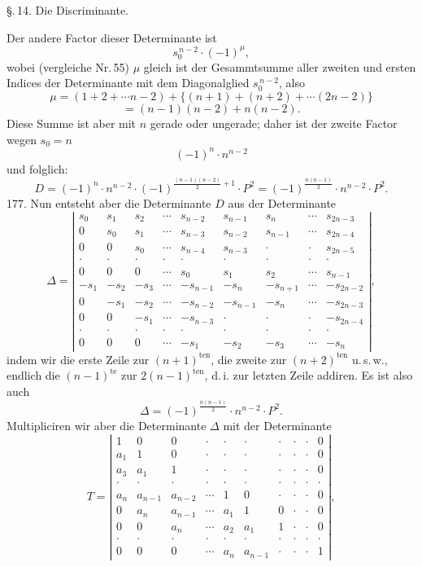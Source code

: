 \documentclass[11pt]{article}
\let\Delta\varDelta
\begin{document}
\S.\,14. Die Discriminante.

Der andere Factor dieser Determinante ist
\[
s_0^{\,n-2} \cdot (-1)^\mu,
\]
wobei (vergleiche Nr.\,55) $\mu$ gleich ist der Gesammtsumme aller zweiten und ersten Indices der Determinante mit dem Diagonalglied $s_0^{\,n-2}$, also
\[
\mu = (1+2+\cdots n-2) + \{(n+1)+(n+2)+\cdots(2n-2)\}
\]
\[
= (n-1)(n-2) + n(n-2).
\]
Diese Summe ist aber mit $n$ gerade oder ungerade; daher ist der zweite Factor wegen $s_0 = n$
\[
(-1)^n \cdot n^{n-2}
\]
und folglich:
\[
D = (-1)^n \cdot n^{n-2} \cdot (-1)^{\frac{(n-1)(n-2)}{2}+1} \cdot P^2 = (-1)^{\frac{n(n-1)}{2}} \cdot n^{n-2} \cdot P^2 .
\]
177. Nun entsteht aber die Determinante $D$ aus der Determinante
\[
\Delta =
\left|
\begin{array}{ccccccccc}
s_0 & s_1 & s_2 & \cdots & s_{n-2} & s_{n-1} & s_n & \cdots & s_{2n-3} \\
0 & s_0 & s_1 & \cdots & s_{n-3} & s_{n-2} & s_{n-1} & \cdots & s_{2n-4} \\
0 & 0 & s_0 & \cdots & s_{n-4} & s_{n-3} & \cdot & \cdot & s_{2n-5} \\
\cdot & \cdot & \cdot & \cdot & \cdot & \cdot & \cdot & \cdot & \cdot \\
0 & 0 & 0 & \cdots & s_0 & s_1 & s_2 & \cdots & s_{n-1} \\
-s_1 & -s_2 & -s_3 & \cdots & -s_{n-1} & -s_n & -s_{n+1} & \cdots & -s_{2n-2} \\
0 & -s_1 & -s_2 & \cdots & -s_{n-2} & -s_{n-1} & -s_n & \cdots & -s_{2n-3} \\
0 & 0 & -s_1 & \cdots & -s_{n-3} & \cdot & \cdot & \cdot & -s_{2n-4} \\
\cdot & \cdot & \cdot & \cdot & \cdot & \cdot & \cdot & \cdot & \cdot \\
0 & 0 & 0 & \cdots & -s_1 & -s_2 & -s_3 & \cdots & -s_n
\end{array}
\right| ,
\]
indem wir die erste Zeile zur $(n+1)^{\mathrm{ten}}$, die zweite zur $(n+2)^{\mathrm{ten}}$ u.\,s.\,w., endlich die $(n-1)^{\mathrm{te}}$ zur $2(n-1)^{\mathrm{ten}}$, d.\,i. zur letzten Zeile addiren. Es ist also auch
\[
\Delta = (-1)^{\frac{n(n-1)}{2}} \cdot n^{n-2} \cdot P^2 .
\]
Multipliciren wir aber die Determinante $\Delta$ mit der Determinante
\[
T =
\left|
\begin{array}{cccccccccc}
1 & 0 & 0 & \cdot & \cdot & \cdot & \cdot & \cdot & \cdot & 0 \\
a_1 & 1 & 0 & \cdot & \cdot & \cdot & \cdot & \cdot & \cdot & 0 \\
a_3 & a_1 & 1 & \cdot & \cdot & \cdot & \cdot & \cdot & \cdot & 0 \\
\cdot & \cdot & \cdot & \cdot & \cdot & \cdot & \cdot & \cdot & \cdot & \cdot \\
a_n & a_{n-1} & a_{n-2} & \cdots & 1 & 0 & \cdot & \cdot & \cdot & 0 \\
0 & a_n & a_{n-1} & \cdots & a_1 & 1 & 0 & \cdot & \cdot & 0 \\
0 & 0 & a_n & \cdots & a_2 & a_1 & 1 & \cdot & \cdot & 0 \\
\cdot & \cdot & \cdot & \cdot & \cdot & \cdot & \cdot & \cdot & \cdot & \cdot \\
0 & 0 & 0 & \cdots & a_n & a_{n-1} & \cdot & \cdot & \cdot & 1
\end{array}
\right| ,
\]
\end{document}
